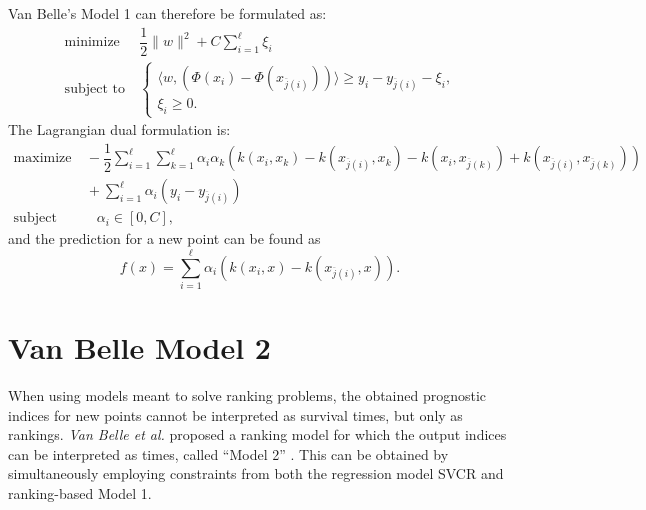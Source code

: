 \documentclass[12pt]{report}
\begin{document}
Van Belle's Model 1 can therefore be formulated as:
\begin{equation} \label{model1primal}
\begin{split}
\text{minimize} &\ \dfrac{1}{2}\| w \|^2 + C\sum_{i=1}^{\ell}\xi_{i} \\
\text{subject to} &\ \begin{cases}
\langle w,(\Phi(x_{i}) - \Phi(x_{\overline{j}(i)})) \rangle \geq y_{i} - y_{\overline{j}(i)} - \xi_{i} \text{,}\\
\xi_{i} \geq 0 \text{.}
\end{cases}
\end{split}
\end{equation}
The Lagrangian dual formulation is:
\begin{equation} \label{model1dual}
\begin{split}
\text{maximize} &\
-\dfrac{1}{2}\sum_{i=1}^{\ell}\sum_{k=1}^{\ell}\alpha_{i}\alpha_{k}(k(x_{i},x_{k})-k(x_{\overline{j}(i)},x_{k})-k(x_{i},x_{\overline{j}(k)})+k(x_{\overline{j}(i)},x_{\overline{j}(k)})) \\
&\ + \sum_{i=1}^{\ell}\alpha_{i}(y_{i} - y_{\overline{j}(i)}) \\
\text{subject to} &\quad \alpha_{i} \in [0,C] \text{,}
\end{split}
\end{equation}
and the prediction for a new point can be found as
\begin{equation} \label{model1f}
f(x) = \sum_{i=1}^{\ell}\alpha_{i}(k(x_{i},x) - k(x_{\overline{j}(i)},x)) \text{.}
\end{equation}

\section{Van Belle Model 2}
When using models meant to solve ranking problems, the obtained prognostic indices for new points cannot be interpreted as survival times, but only as rankings. \textit{Van Belle et al.} proposed a ranking model for which the output indices can be interpreted as times, called ``Model 2'' \cite{vanbelle11}. This can be obtained by simultaneously employing constraints from both the regression model SVCR and ranking-based Model 1.
\end{document}
